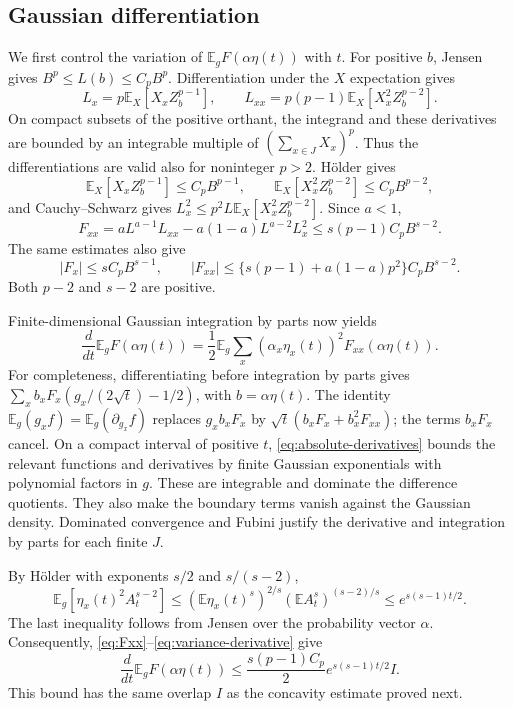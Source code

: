 \documentclass[11pt]{amsart}
\newcommand{\E}{\mathbb E}
\theoremstyle{remark}
\numberwithin{equation}{section}
\begin{document}
\subsection{Gaussian differentiation}
We first control the variation of $\E_gF(\alpha\eta(t))$ with $t$.
For positive $b$, Jensen gives $B^p\le L(b)\le C_p B^p$.
Differentiation under the $X$ expectation gives
\[
 L_x=p\E_X[X_xZ_b^{p-1}],\qquad
 L_{xx}=p(p-1)\E_X[X_x^2Z_b^{p-2}].
\]
On compact subsets of the positive orthant, the integrand and these
derivatives are bounded by an integrable multiple of
$(\sum_{x\in J}X_x)^p$. Thus the differentiations are valid also for
noninteger $p>2$. H\"older gives
\[
 \E_X[X_xZ_b^{p-1}]\le C_p B^{p-1},\qquad
 \E_X[X_x^2Z_b^{p-2}]\le C_p B^{p-2},
\]
and Cauchy--Schwarz gives
$L_x^2\le p^2L\E_X[X_x^2Z_b^{p-2}]$.
Since $a<1$,
\begin{equation}\label{eq:Fxx}
 F_{xx}=aL^{a-1}L_{xx}-a(1-a)L^{a-2}L_x^2
 \le s(p-1)C_p B^{s-2}.
\end{equation}
The same estimates also give
\begin{equation}\label{eq:absolute-derivatives}
 |F_x|\le s C_p B^{s-1},\qquad
 |F_{xx}|\le\{s(p-1)+a(1-a)p^2\}C_p B^{s-2}.
\end{equation}
Both $p-2$ and $s-2$ are positive.

Finite-dimensional Gaussian integration by parts now yields
\begin{equation}\label{eq:variance-derivative}
 \frac d{dt}\E_gF(\alpha\eta(t))
 =\frac12\E_g\sum_x(\alpha_x\eta_x(t))^2F_{xx}(\alpha\eta(t)).
\end{equation}
For completeness, differentiating before integration by parts gives
$\sum_x b_xF_x(g_x/(2\sqrt t)-1/2)$, with $b=\alpha\eta(t)$.
The identity $\E_g(g_x f)=\E_g(\partial_{g_x}f)$ replaces
$g_xb_xF_x$ by $\sqrt t(b_xF_x+b_x^2F_{xx})$; the terms $b_xF_x$
cancel. On a compact interval of positive $t$, \eqref{eq:absolute-derivatives}
bounds the relevant functions and derivatives by finite Gaussian exponentials
with polynomial factors in $g$. These are integrable and dominate the
difference quotients. They also make the boundary terms vanish against the
Gaussian density. Dominated convergence and Fubini justify the derivative and
integration by parts for each finite $J$.

By H\"older with exponents $s/2$ and $s/(s-2)$,
\[
 \E_g[\eta_x(t)^2 A_t^{s-2}]
 \le (\E\eta_x(t)^s)^{2/s}(\E A_t^s)^{(s-2)/s}
 \le e^{s(s-1)t/2}.
\]
The last inequality follows from Jensen over the probability vector $\alpha$.
Consequently, \eqref{eq:Fxx}--\eqref{eq:variance-derivative} give
\begin{equation}\label{eq:perturbation-derivative}
 \frac d{dt}\E_gF(\alpha\eta(t))
 \le \frac{s(p-1)C_p}{2}e^{s(s-1)t/2} I.
\end{equation}
This bound has the same overlap $I$ as the concavity estimate proved next.
\end{document}

